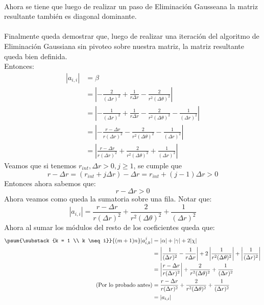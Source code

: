 \documentclass[12pt]{article}
\newcommand{\sub}[3]{\ensuremath{#1_{#2,#3}}}
\begin{document}
\paragraph{} Ahora se tiene que luego de realizar un paso de Eliminación Gausseana la matriz resultante también es diagonal dominante.
\paragraph{} Finalmente queda demostrar que, luego de realizar una iteración del algoritmo de Eliminación Gaussiana sin pivoteo sobre nuestra matriz, la matriz resultante queda bien definida. \\ %
Entonces:
\[\begin{split}
  | a_{i,i} | & = \beta \\
              & = \left \vert - \frac{2}{(\Delta r)^2} + \frac{1}{r \Delta r} - \frac{2}{r^2 (\Delta \theta)^2} \right \vert \\
              & = \left \vert - \frac{1}{(\Delta r)^2} + \frac{1}{r \Delta r} - \frac{2}{r^2 (\Delta \theta)^2} - \frac{1}{(\Delta r)^2} \right \vert \\
              & = \left \vert - \frac{r - \Delta r}{r (\Delta r)^2} - \frac{2}{r^2 (\Delta \theta)^2} - \frac{1}{(\Delta r)^2} \right \vert \\
              & = \left \vert \frac{r - \Delta r}{r (\Delta r)^2} + \frac{2}{r^2 (\Delta \theta)^2} + \frac{1}{(\Delta r)^2} \right \vert
\end{split}\]
Veamos que si tenemos \(r_{int}, \Delta r > 0, j \geq 1\), se cumple que
\[
  r - \Delta r = (r_{int} + j \Delta r) - \Delta r = r_{int} + (j - 1) \Delta r > 0
\]
Entonces ahora sabemos que:
\[
  r - \Delta r > 0
\]
Ahora veamos como queda la sumatoria sobre una fila. Notar que:  
\[
  | \sub{a}{i}{i} | = \frac{r - \Delta r}{r (\Delta r)^2} + \frac{2}{r^2 (\Delta \theta)^2} + \frac{1}{(\Delta r)^2}
\]
Ahora al sumar los módulos del resto de los coeficientes queda que:
\[\begin{split}
  \psum{\substack{k = 1 \\ k \neq i}}{(m+1)n} |\sub{a}{i}{k}^{j}| & = |\alpha| + |\gamma| + 2 |\chi| \\
                                                                  & = \left \vert \frac{1}{(\Delta r)^2} - \frac{1}{r \Delta r} \right \vert + 2 \left \vert \frac{1}{r^2 (\Delta \theta)^2} \right \vert + \left \vert \frac{1}{(\Delta r)^2} \right \vert \\
                                                                       & = \left \vert \frac{r - \Delta r}{r (\Delta r)^2} \right \vert + \frac{2}{r^2 (\Delta \theta)^2} + \frac{1}{(\Delta r)^2} \\
                                                                       \text{(Por lo probado antes)}
                                                                       & = \frac{r - \Delta r}{r (\Delta r)^2} + \frac{2}{r^2 (\Delta \theta)^2} + \frac{1}{(\Delta r)^2} \\
                                                                       & = | \sub{a}{i}{i} |
\end{split}\] %
\end{document}
